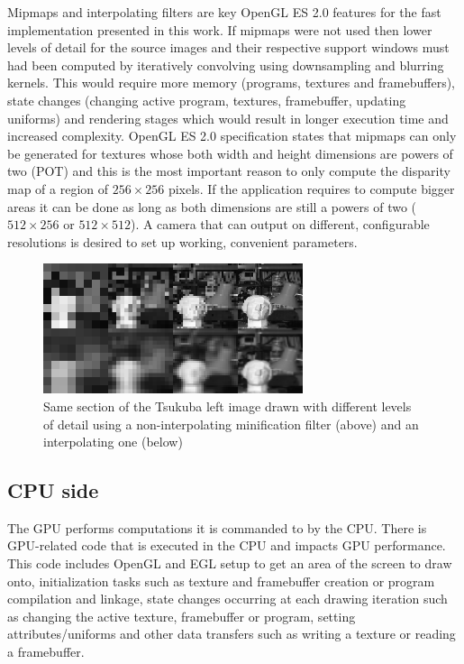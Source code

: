 \documentclass[conference]{IEEEtran}
\begin{document}
Mipmaps and interpolating filters are key OpenGL ES 2.0 features for the fast implementation presented in this work. If mipmaps were not used then lower levels of detail for the source images and their respective support windows must had been computed by iteratively convolving using downsampling and blurring kernels. This would require more memory (programs, textures and framebuffers), state changes (changing active program, textures, framebuffer, updating uniforms) and rendering stages which would result in longer execution time and increased complexity. OpenGL ES 2.0 specification states that mipmaps can only be generated for textures whose both width and height dimensions are powers of two (POT) and this is the most important reason to only compute the disparity map of a region of $256 \times 256$ pixels. If the application requires to compute bigger areas it can be done as long as both dimensions are still a powers of two ($512 \times 256$ or $512 \times 512$). A camera that can output on different, configurable resolutions is desired to set up working, convenient parameters.

\begin{figure}[!t]
	\centering
	\includegraphics[width=3.0in]{filters}
	\caption{Same section of the Tsukuba left image drawn with different levels of detail using a non-interpolating minification filter (above) and an interpolating one (below)}
	\label{fig:filters}
\end{figure}

	\subsection{CPU side}
The GPU performs computations it is commanded to by the CPU. There is GPU-related code that is executed in the CPU and impacts GPU performance. This code includes OpenGL and EGL setup to get an area of the screen to draw onto, initialization tasks such as texture and framebuffer creation or program compilation and linkage, state changes occurring at each drawing iteration such as changing the active texture, framebuffer or program, setting attributes/uniforms and other data transfers such as writing a texture or reading a framebuffer.
\end{document}

